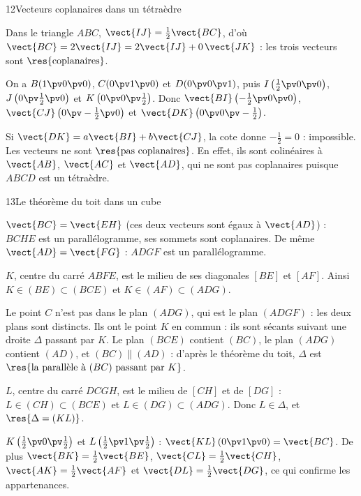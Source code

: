 \begin{deuxcolonnes}
\begin{corrige}{12}{Vecteurs coplanaires dans un tétraèdre}
\begin{questions}
  \item Dans le triangle $ABC$, $\vect{IJ}=\frac12\vect{BC}$, d'où $\vect{BC}=2\vect{IJ}=2\vect{IJ}+0\,\vect{JK}$ : les trois
    vecteurs sont $\res{\text{coplanaires}}$.
  \item On a $B(1\pv0\pv0)$, $C(0\pv1\pv0)$ et $D(0\pv0\pv1)$, puis $I\left(\frac12\pv0\pv0\right)$, $J\left(0\pv\frac12\pv0\right)$ et
    $K\left(0\pv0\pv\frac12\right)$. Donc $\vect{BI}\left(-\frac12\pv0\pv0\right)$, $\vect{CJ}\left(0\pv-\frac12\pv0\right)$ et
    $\vect{DK}\left(0\pv0\pv-\frac12\right)$.
  \item Si $\vect{DK}=a\vect{BI}+b\vect{CJ}$, la cote donne $-\frac12=0$ : impossible. Les vecteurs ne sont $\res{\text{pas
    coplanaires}}$. En effet, ils sont colinéaires à $\vect{AB}$, $\vect{AC}$ et $\vect{AD}$, qui ne sont pas coplanaires puisque
    $ABCD$ est un tétraèdre.
\end{questions}
\end{corrige}

\end{deuxcolonnes}

\corrigesSouples
\begin{corrige}{13}{Le théorème du toit dans un cube}
\begin{questions}
  \item $\vect{BC}=\vect{EH}$ (ces deux vecteurs sont égaux à $\vect{AD}$) : $BCHE$ est un parallélogramme, ses sommets sont
    coplanaires. De même $\vect{AD}=\vect{FG}$ : $ADGF$ est un parallélogramme.
  \item $K$, centre du carré $ABFE$, est le milieu de ses diagonales $[BE]$ et $[AF]$. Ainsi $K\in(BE)\subset(BCE)$ et
    $K\in(AF)\subset(ADG)$.
  \item Le point $C$ n'est pas dans le plan $(ADG)$, qui est le plan $(ADGF)$ : les deux plans sont distincts. Ils ont le point $K$ en
    commun : ils sont sécants suivant une droite $\Delta$ passant par $K$. Le plan $(BCE)$ contient $(BC)$, le plan $(ADG)$ contient
    $(AD)$, et $(BC)\parallel(AD)$ : d'après le théorème du toit, $\Delta$ est $\res{\text{la parallèle à }(BC)\text{ passant par }K}$.
  \item $L$, centre du carré $DCGH$, est le milieu de $[CH]$ et de $[DG]$ : $L\in(CH)\subset(BCE)$ et $L\in(DG)\subset(ADG)$. Donc
    $L\in\Delta$, et $\res{\Delta=(KL)}$.
  \item $K\left(\frac12\pv0\pv\frac12\right)$ et $L\left(\frac12\pv1\pv\frac12\right)$ : $\vect{KL}\,(0\pv1\pv0)=\vect{BC}$. De plus
    $\vect{BK}=\frac12\vect{BE}$, $\vect{CL}=\frac12\vect{CH}$, $\vect{AK}=\frac12\vect{AF}$ et $\vect{DL}=\frac12\vect{DG}$, ce qui
    confirme les appartenances.
\end{questions}
\end{corrige}

